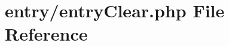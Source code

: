 \hypertarget{entry_clear_8php}{}\section{entry/entry\+Clear.php File Reference}
\label{entry_clear_8php}
